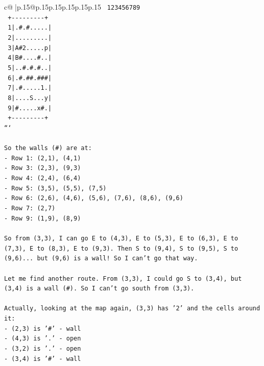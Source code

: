 \documentclass{article}
\begin{document}
{\begin{supertabular}{c@{$\;$}|p{.15\linewidth}@{}p{.15\linewidth}p{.15\linewidth}p{.15\linewidth}p{.15\linewidth}p{.15\linewidth}}
{{{\texttt{   123456789} \\
\texttt{  +{-}{-}{-}{-}{-}{-}{-}{-}{-}+} \\
\texttt{ 1|.\#.\#.....|} \\
\texttt{ 2|.........|} \\
\texttt{ 3|A\#2.....p|} \\
\texttt{ 4|B\#....\#..|} \\
\texttt{ 5|..\#.\#.\#..|} \\
\texttt{ 6|.\#.\#\#.\#\#\#|} \\
\texttt{ 7|.\#.....1.|} \\
\texttt{ 8|....S...y|} \\
\texttt{ 9|\#.....x\#.|} \\
\texttt{  +{-}{-}{-}{-}{-}{-}{-}{-}{-}+} \\
\texttt{```} \\
\\ 
\texttt{So the walls (\#) are at:} \\
\texttt{{-} Row 1: (2,1), (4,1)} \\
\texttt{{-} Row 3: (2,3), (9,3)} \\
\texttt{{-} Row 4: (2,4), (6,4)} \\
\texttt{{-} Row 5: (3,5), (5,5), (7,5)} \\
\texttt{{-} Row 6: (2,6), (4,6), (5,6), (7,6), (8,6), (9,6)} \\
\texttt{{-} Row 7: (2,7)} \\
\texttt{{-} Row 9: (1,9), (8,9)} \\
\\ 
\texttt{So from (3,3), I can go E to (4,3), E to (5,3), E to (6,3), E to (7,3), E to (8,3), E to (9,3). Then S to (9,4), S to (9,5), S to (9,6)... but (9,6) is a wall! So I can't go that way.} \\
\\ 
\texttt{Let me find another route. From (3,3), I could go S to (3,4), but (3,4) is a wall (\#). So I can't go south from (3,3).} \\
\\ 
\texttt{Actually, looking at the map again, (3,3) has '2' and the cells around it:} \\
\texttt{{-} (2,3) is '\#' {-} wall} \\
\texttt{{-} (4,3) is '.' {-} open} \\
\texttt{{-} (3,2) is '.' {-} open} \\
\texttt{{-} (3,4) is '\#' {-} wall} \\
\\ 
}}}
\end{supertabular}}
\end{document}
